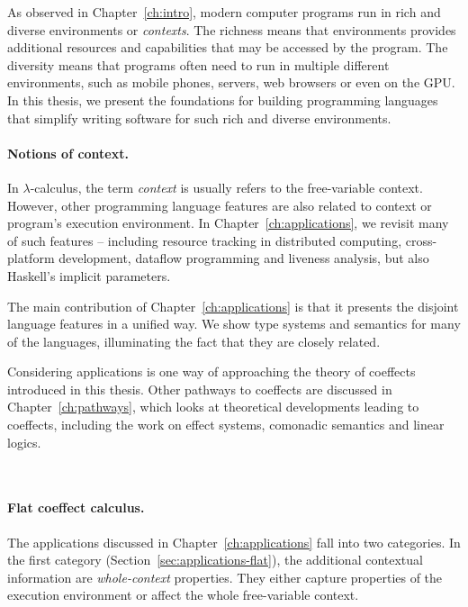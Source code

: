 As observed in Chapter~\ref{ch:intro}, modern computer programs run in rich and diverse environments
or \emph{contexts}. The richness means that environments provides additional resources and
capabilities that may be accessed by the program. The diversity means that programs often need to
run in multiple different environments, such as mobile phones, servers, web browsers or even on the
GPU. In this thesis, we present the foundations for building programming languages that simplify
writing software for such rich and diverse environments.


\paragraph{Notions of context.}

In $\lambda$-calculus, the term \emph{context} is usually refers to the free-variable context.
However, other programming language features are also related to context or program's
execution environment. In Chapter~\ref{ch:applications}, we revisit many of such features --
including resource tracking in distributed computing, cross-platform development, dataflow
programming and liveness analysis, but also Haskell's implicit parameters.

The main contribution of Chapter~\ref{ch:applications} is that it presents the disjoint language
features in a unified way. We show type systems and semantics for many of the languages,
illuminating the fact that they are closely related.

Considering applications is one way of approaching the theory of coeffects introduced in this thesis.
Other pathways to coeffects are discussed in Chapter~\ref{ch:pathways}, which looks at theoretical
developments leading to coeffects, including the work on effect systems, comonadic semantics and
linear logics.

~

\paragraph{Flat coeffect calculus.}

The applications discussed in Chapter~\ref{ch:applications} fall into two categories. In the first
category (Section~\ref{sec:applications-flat}), the additional contextual information are
\emph{whole-context} properties. They either capture properties of the execution environment or
affect the whole free-variable context.

